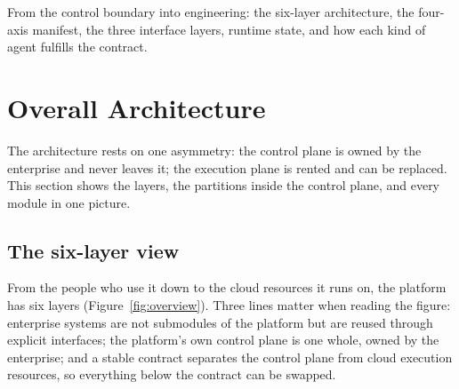 {From the control boundary into engineering: the six-layer architecture, the four-axis manifest, the three interface layers, runtime state, and how each kind of agent fulfills the contract.}

\section{Overall Architecture}
\label{sec:overview}

The architecture rests on one asymmetry: the control plane is owned by the enterprise and never leaves it; the execution plane is rented and can be replaced. This section shows the layers, the partitions inside the control plane, and every module in one picture.

\subsection{The six-layer view}

From the people who use it down to the cloud resources it runs on, the platform has six layers (Figure~\ref{fig:overview}). Three lines matter when reading the figure: enterprise systems are not submodules of the platform but are reused through explicit interfaces; the platform's own control plane is one whole, owned by the enterprise; and a stable contract separates the control plane from cloud execution resources, so everything below the contract can be swapped.

